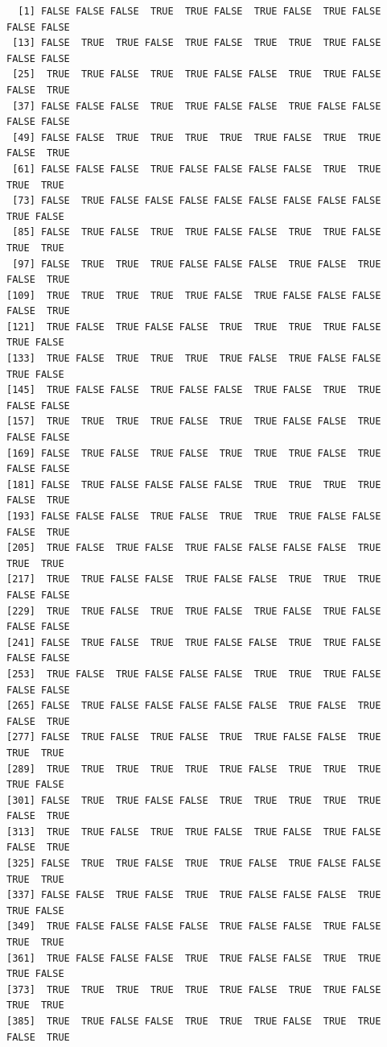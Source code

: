\documentclass[
  letterpaper,
  DIV=11,
  numbers=noendperiod]{scrreprt}
\begin{document}
\begin{verbatim}
  [1] FALSE FALSE FALSE  TRUE  TRUE FALSE  TRUE FALSE  TRUE FALSE FALSE FALSE
 [13] FALSE  TRUE  TRUE FALSE  TRUE FALSE  TRUE  TRUE  TRUE FALSE FALSE FALSE
 [25]  TRUE  TRUE FALSE  TRUE  TRUE FALSE FALSE  TRUE  TRUE FALSE FALSE  TRUE
 [37] FALSE FALSE FALSE  TRUE  TRUE FALSE FALSE  TRUE FALSE FALSE FALSE FALSE
 [49] FALSE FALSE  TRUE  TRUE  TRUE  TRUE  TRUE FALSE  TRUE  TRUE FALSE  TRUE
 [61] FALSE FALSE FALSE  TRUE FALSE FALSE FALSE FALSE  TRUE  TRUE  TRUE  TRUE
 [73] FALSE  TRUE FALSE FALSE FALSE FALSE FALSE FALSE FALSE FALSE  TRUE FALSE
 [85] FALSE  TRUE FALSE  TRUE  TRUE FALSE FALSE  TRUE  TRUE FALSE  TRUE  TRUE
 [97] FALSE  TRUE  TRUE  TRUE FALSE FALSE FALSE  TRUE FALSE  TRUE FALSE  TRUE
[109]  TRUE  TRUE  TRUE  TRUE  TRUE FALSE  TRUE FALSE FALSE FALSE FALSE  TRUE
[121]  TRUE FALSE  TRUE FALSE FALSE  TRUE  TRUE  TRUE  TRUE FALSE  TRUE FALSE
[133]  TRUE FALSE  TRUE  TRUE  TRUE  TRUE FALSE  TRUE FALSE FALSE  TRUE FALSE
[145]  TRUE FALSE FALSE  TRUE FALSE FALSE  TRUE FALSE  TRUE  TRUE FALSE FALSE
[157]  TRUE  TRUE  TRUE  TRUE FALSE  TRUE  TRUE FALSE FALSE  TRUE FALSE FALSE
[169] FALSE  TRUE FALSE  TRUE FALSE  TRUE  TRUE  TRUE FALSE  TRUE FALSE FALSE
[181] FALSE  TRUE FALSE FALSE FALSE FALSE  TRUE  TRUE  TRUE  TRUE FALSE  TRUE
[193] FALSE FALSE FALSE  TRUE FALSE  TRUE  TRUE  TRUE FALSE FALSE FALSE  TRUE
[205]  TRUE FALSE  TRUE FALSE  TRUE FALSE FALSE FALSE FALSE  TRUE  TRUE  TRUE
[217]  TRUE  TRUE FALSE FALSE  TRUE FALSE FALSE  TRUE  TRUE  TRUE FALSE FALSE
[229]  TRUE  TRUE FALSE  TRUE  TRUE FALSE  TRUE FALSE  TRUE FALSE FALSE FALSE
[241] FALSE  TRUE FALSE  TRUE  TRUE FALSE FALSE  TRUE  TRUE FALSE FALSE FALSE
[253]  TRUE FALSE  TRUE FALSE FALSE FALSE  TRUE  TRUE  TRUE FALSE FALSE FALSE
[265] FALSE  TRUE FALSE FALSE FALSE FALSE FALSE  TRUE FALSE  TRUE FALSE  TRUE
[277] FALSE  TRUE FALSE  TRUE FALSE  TRUE  TRUE FALSE FALSE  TRUE  TRUE  TRUE
[289]  TRUE  TRUE  TRUE  TRUE  TRUE  TRUE FALSE  TRUE  TRUE  TRUE  TRUE FALSE
[301] FALSE  TRUE  TRUE FALSE FALSE  TRUE  TRUE  TRUE  TRUE  TRUE FALSE  TRUE
[313]  TRUE  TRUE FALSE  TRUE  TRUE FALSE  TRUE FALSE  TRUE FALSE FALSE  TRUE
[325] FALSE  TRUE  TRUE FALSE  TRUE  TRUE FALSE  TRUE FALSE FALSE  TRUE  TRUE
[337] FALSE FALSE  TRUE FALSE  TRUE  TRUE FALSE FALSE FALSE  TRUE  TRUE FALSE
[349]  TRUE FALSE FALSE FALSE FALSE  TRUE FALSE FALSE  TRUE FALSE  TRUE  TRUE
[361]  TRUE FALSE FALSE FALSE  TRUE  TRUE FALSE FALSE  TRUE  TRUE  TRUE FALSE
[373]  TRUE  TRUE  TRUE  TRUE  TRUE  TRUE FALSE  TRUE  TRUE FALSE  TRUE  TRUE
[385]  TRUE  TRUE FALSE FALSE  TRUE  TRUE  TRUE FALSE  TRUE  TRUE FALSE  TRUE

\end{verbatim}
\end{document}
